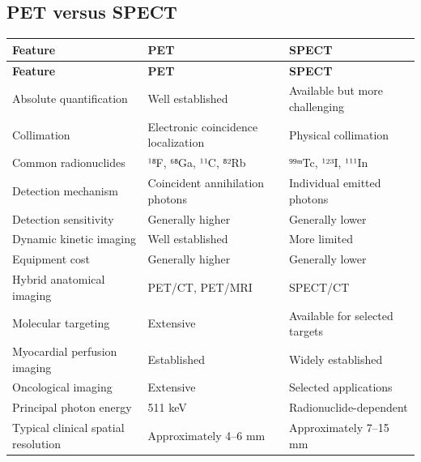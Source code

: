 \subsection{PET versus SPECT}
\begin{longtable}{@{}p{}p{}p{}@{}}
\toprule
\textbf{Feature} & \textbf{PET} & \textbf{SPECT} \\
\midrule
\endfirsthead
\toprule
\textbf{Feature} & \textbf{PET} & \textbf{SPECT} \\
\midrule
\endhead
Absolute quantification & Well established & Available but more challenging \\
Collimation & Electronic coincidence localization & Physical collimation \\
Common radionuclides & ¹⁸F, ⁶⁸Ga, ¹¹C, ⁸²Rb & ⁹⁹ᵐTc, ¹²³I, ¹¹¹In \\
Detection mechanism & Coincident annihilation photons & Individual emitted photons \\
Detection sensitivity & Generally higher & Generally lower \\
Dynamic kinetic imaging & Well established & More limited \\
Equipment cost & Generally higher & Generally lower \\
Hybrid anatomical imaging & PET/CT, PET/MRI & SPECT/CT \\
Molecular targeting & Extensive & Available for selected targets \\
Myocardial perfusion imaging & Established & Widely established \\
Oncological imaging & Extensive & Selected applications \\
Principal photon energy & 511 keV & Radionuclide-dependent \\
Typical clinical spatial resolution & Approximately 4--6 mm & Approximately 7--15 mm \\
\bottomrule
\end{longtable}

